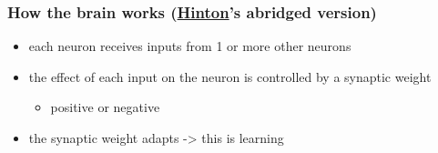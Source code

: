\documentclass[xcolor=table]{beamer}
\begin{document}
\begin{mdframe}%

\frametitle{How the brain works (\href{http://www.cs.toronto.edu/~hinton/}{Hinton}'s abridged version)}\label{heading-sec-how-the-brain-works-hintonhttp-wwwcstorontoeduhintons-abridged-version}%

\begin{itemize}%

\item{}
each neuron receives inputs from 1 or more other neurons%

\item{}
the effect of each input on the neuron is controlled by a synaptic weight%

\begin{itemize}[noitemsep,topsep=\mdcompacttopsep]%

\item{}positive or negative%
\end{itemize}%

\item{}
the synaptic weight adapts -\textgreater{} this is learning%
\end{itemize}%
\end{mdframe}\label{sec-how-the-brain-works-hintonhttp-wwwcstorontoeduhintons-abridged-version}%
\end{document}
